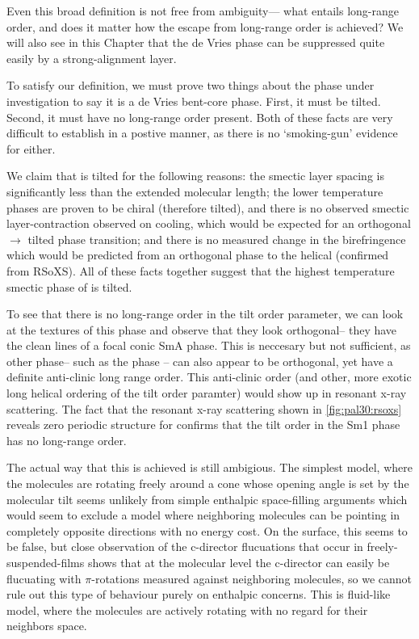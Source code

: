 \documentclass[aagreenthesis]{subfiles}
\begin{document}
Even this broad definition is not free from ambiguity--- what entails long-range
order, and does it matter how the escape from long-range order is achieved? We will also see in this Chapter that the de Vries phase can be
suppressed quite easily by a strong-alignment layer.



To satisfy our definition, we must prove two things about the phase under
investigation to say it is a de Vries bent-core phase. First, it must be tilted.
Second, it must have no long-range order present. Both of these facts are very
difficult to establish in a postive manner, as there is no `smoking-gun'
evidence for either.

We claim that \nfour{} is tilted for the following reasons: the smectic layer spacing is
significantly less than the extended molecular length; the lower temperature
phases are proven to be chiral (therefore tilted), and there is no observed
smectic layer-contraction observed on cooling, which would be expected for an
orthogonal$\rightarrow$ tilted phase transition; and there is no measured change in the birefringence which would be predicted from an orthogonal phase to the
helical \smcpalpha{} (confirmed from RSoXS). All of these facts together suggest
that the highest temperature smectic phase of \nfour{} is tilted.

To see that there is no long-range order in the tilt order parameter, we can
look at the textures of this phase and observe that they look orthogonal-- they
have the clean lines of a focal conic SmA phase. This
is neccesary but not sufficient, as other phase-- such as the \smcapa{} phase --
can also appear to be orthogonal, yet have a definite anti-clinic long range
order. This anti-clinic order (and other, more exotic long helical ordering of
the tilt order paramter) would show up in resonant x-ray scattering. The fact
that the resonant x-ray scattering shown in \autoref{fig:pal30:rsoxs} reveals
zero periodic structure for \nfour{} confirms that the tilt order in the Sm1
phase has no long-range order.

The actual way that this is achieved is still ambigious. The simplest model,
where the molecules are rotating freely around a cone whose opening angle is
set by the molecular tilt seems unlikely from simple enthalpic space-filling
arguments which would seem to exclude a model where neighboring molecules can be
pointing in completely opposite directions with no energy cost. On the surface,
this seems to be false, but close observation of the c-director flucuations
that occur in freely-suspended-films shows that at the molecular level the
c-director can easily be flucuating with $\pi$-rotations measured against
neighboring molecules, so we cannot rule out this type of behaviour purely on
enthalpic concerns. This is
fluid-like model, where the molecules are actively rotating with no regard for their
neighbors space.
\end{document}
